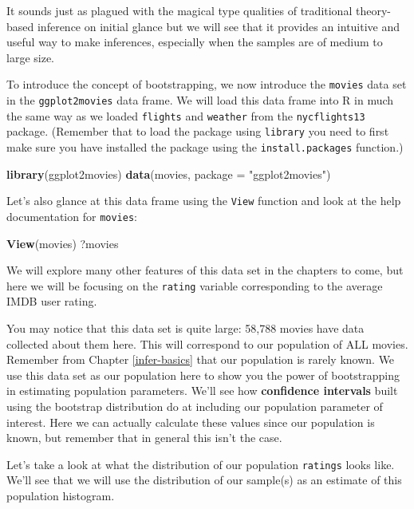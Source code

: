 \documentclass[]{tufte-book}
\newenvironment{Shaded}{\begin{snugshade}}{\end{snugshade}}
\newcommand{\KeywordTok}[1]{\textcolor[rgb]{0.13,0.29,0.53}{\textbf{{#1}}}}
\newcommand{\DataTypeTok}[1]{\textcolor[rgb]{0.13,0.29,0.53}{{#1}}}
\newcommand{\StringTok}[1]{\textcolor[rgb]{0.31,0.60,0.02}{{#1}}}
\newcommand{\NormalTok}[1]{{#1}}
\begin{document}
It sounds just as plagued with the magical type qualities of traditional
theory-based inference on initial glance but we will see that it
provides an intuitive and useful way to make inferences, especially when
the samples are of medium to large size.

To introduce the concept of bootstrapping, we now introduce the
\texttt{movies} data set in the \texttt{ggplot2movies} data frame. We
will load this data frame into R in much the same way as we loaded
\texttt{flights} and \texttt{weather} from the \texttt{nycflights13}
package. (Remember that to load the package using \texttt{library} you
need to first make sure you have installed the package using the
\texttt{install.packages} function.)

\begin{Shaded}
\begin{Highlighting}[]
\KeywordTok{library}\NormalTok{(ggplot2movies)}
\KeywordTok{data}\NormalTok{(movies, }\DataTypeTok{package =} \StringTok{"ggplot2movies"}\NormalTok{)}
\end{Highlighting}
\end{Shaded}

Let's also glance at this data frame using the \texttt{View} function
and look at the help documentation for \texttt{movies}:

\begin{Shaded}
\begin{Highlighting}[]
\KeywordTok{View}\NormalTok{(movies)}
\NormalTok{?movies}
\end{Highlighting}
\end{Shaded}

We will explore many other features of this data set in the chapters to
come, but here we will be focusing on the \texttt{rating} variable
corresponding to the average IMDB user rating.

You may notice that this data set is quite large: 58,788 movies have
data collected about them here. This will correspond to our population
of ALL movies. Remember from Chapter \ref{infer-basics} that our
population is rarely known. We use this data set as our population here
to show you the power of bootstrapping in estimating population
parameters. We'll see how \textbf{confidence intervals} built using the
bootstrap distribution do at including our population parameter of
interest. Here we can actually calculate these values since our
population is known, but remember that in general this isn't the case.

Let's take a look at what the distribution of our population
\texttt{ratings} looks like. We'll see that we will use the distribution
of our sample(s) as an estimate of this population histogram.
\end{document}
